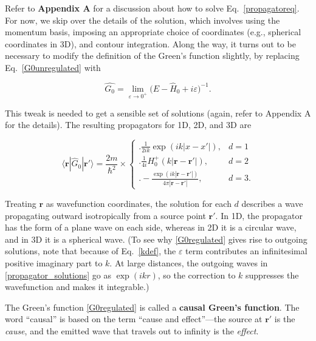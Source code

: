 \documentclass[pra,12pt]{revtex4}
\begin{document}
Refer to \textbf{Appendix A} for a discussion about how to solve
Eq.~\eqref{propagatoreq}.  For now, we skip over the details of
the solution, which involves using the momentum basis, imposing an
appropriate choice of coordinates (e.g., spherical coordinates in 3D),
and contour integration.  Along the way, it turns out to be necessary
to modify the definition of the Green's function slightly, by
replacing Eq.~\eqref{G0unregulated} with
\begin{framed}
  \begin{equation}
    \hat{G_0} = \lim_{\varepsilon\rightarrow 0^+} \big(E - \hat{H}_0 + i \varepsilon\big)^{-1}.
    \label{G0regulated}
  \end{equation}
\end{framed}
\noindent
This tweak is needed to get a sensible set of solutions (again, refer
to Appendix A for the details).  The resulting propagators for 1D, 2D,
and 3D are
\begin{framed}
  \begin{equation}
    \langle\mathbf{r}|\hat{G}_0|\mathbf{r}'\rangle = \frac{2m}{\hbar^2} \times \begin{cases} \Bigg.\displaystyle\frac{1}{2ik} \exp\left(ik|x-x'|\right),& d=1\\ \Bigg. \displaystyle\frac{1}{4i} H^+_0(k|\mathbf{r}-\mathbf{r'}|), & d=2 \\ \displaystyle \Bigg. - \frac{\exp\left(ik|\mathbf{r}-\mathbf{r}'|\right)}{4\pi|\mathbf{r}-\mathbf{r}'|}, & d = 3.  \end{cases}
    \label{propagator_solutions}
  \end{equation}
\end{framed}
\noindent
Treating $\mathbf{r}$ as wavefunction coordinates, the solution for
each $d$ describes a wave propagating outward isotropically from a
source point $\mathbf{r}'$.  In 1D, the propagator has the form of a
plane wave on each side, whereas in 2D it is a circular wave, and in
3D it is a spherical wave.  (To see why \eqref{G0regulated} gives rise
to outgoing solutions, note that because of Eq.~\eqref{kdef}, the
$\varepsilon$ term contributes an infinitesimal positive imaginary
part to $k$.  At large distances, the outgoing waves in
\eqref{propagator_solutions} go as $\exp(ikr)$, so the correction to
$k$ suppresses the wavefunction and makes it integrable.)

The Green's function \eqref{G0regulated} is called a \textbf{causal
  Green's function}.  The word ``causal'' is based on the term ``cause
and effect''---the source at $\mathbf{r}'$ is the \textit{cause}, and
the emitted wave that travels out to infinity is the \textit{effect}.
\end{document}
